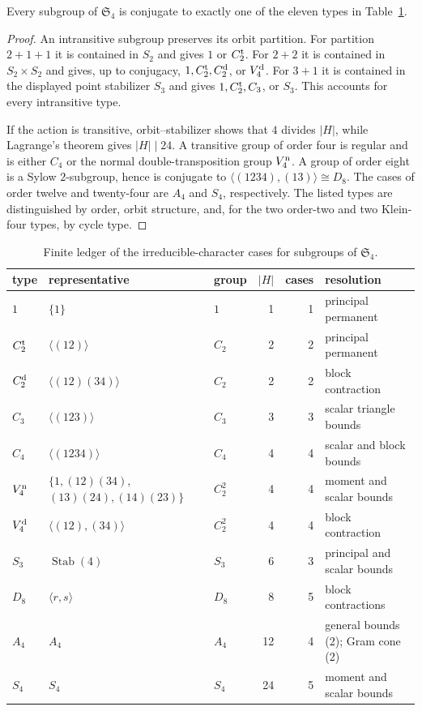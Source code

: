 \documentclass[10pt,twoside]{siamart1116}
\newcommand{\Sn}{\mathfrak S}
\begin{document}
\begin{lemma}\label{lem:subgroup-classification}
Every subgroup of $\Sn_4$ is conjugate to exactly one of the eleven types in
Table~\ref{tab:s4-subgroups}.
\end{lemma}

\begin{proof}
An intransitive subgroup preserves its orbit partition.  For partition
$2+1+1$ it is contained in $S_2$ and gives $1$ or $C_2^{\rm t}$.  For
$2+2$ it is contained in $S_2\times S_2$ and gives, up to conjugacy,
$1,C_2^{\rm t},C_2^{\rm d}$, or $V_4^{\rm d}$.  For $3+1$ it is contained
in the displayed point stabilizer $S_3$ and gives
$1,C_2^{\rm t},C_3$, or $S_3$.  This accounts for every intransitive type.

If the action is transitive, orbit--stabilizer shows that $4$ divides
$|H|$, while Lagrange's theorem gives $|H|\mid24$.  A transitive group of
order four is regular and is either $C_4$ or the normal
double-transposition group $V_4^{\rm n}$.  A group of order eight is a Sylow
$2$-subgroup, hence is conjugate to
$\langle(1234),(13)\rangle\cong D_8$.  The cases of order twelve and
twenty-four are $A_4$ and $S_4$, respectively.  The listed types are
distinguished by order, orbit structure, and, for the two order-two and two
Klein-four types, by cycle type.
\end{proof}

\begin{table}[htbp]
\caption{Finite ledger of the irreducible-character cases for subgroups of $\Sn_4$.}
\label{tab:s4-subgroups}
\centering
\footnotesize
\begin{tabularx}{\textwidth}{@{}l>{\raggedright\arraybackslash}Xlrr>{\raggedright\arraybackslash}X@{}}
\toprule
type & representative & group & $|H|$ & cases & resolution\\
\midrule
$1$ & $\{1\}$ & $1$ & 1&1& principal permanent\\
$C_2^{\rm t}$ & $\langle(12)\rangle$ & $C_2$ &2&2& principal permanent\\
$C_2^{\rm d}$ & $\langle(12)(34)\rangle$ & $C_2$ &2&2& block contraction\\
$C_3$ & $\langle(123)\rangle$ & $C_3$ &3&3& scalar triangle bounds\\
$C_4$ & $\langle(1234)\rangle$ & $C_4$ &4&4& scalar and block bounds\\
$V_4^{\rm n}$ & $\{1,(12)(34),$\linebreak
$(13)(24),(14)(23)\}$ & $C_2^2$ &4&4& moment and scalar bounds\\
$V_4^{\rm d}$ & $\langle(12),(34)\rangle$ & $C_2^2$ &4&4& block contraction\\
$S_3$ & $\operatorname{Stab}(4)$ & $S_3$ &6&3& principal and scalar bounds\\
$D_8$ & $\langle r,s\rangle$ & $D_8$ &8&5& block contractions\\
$A_4$ & $A_4$ & $A_4$ &12&4& general bounds (2); Gram cone (2)\\
$S_4$ & $S_4$ & $S_4$ &24&5& moment and scalar bounds\\
\bottomrule
\end{tabularx}
\end{table}
\end{document}
